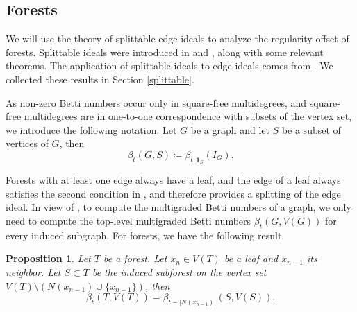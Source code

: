 \documentclass[dvipsnames,10pt]{article}
\newtheorem{proposition}[theorem]{Proposition}
\begin{document}
\subsection{Forests} \label{forests}

We will use the theory of splittable edge ideals to analyze the regularity offset of forests. Splittable ideals were introduced in \cite{ELIAHOU19901} and \cite{FATABBI200192}, along with some relevant theorems. The application of splittable ideals to edge ideals comes from \cite{split}. We collected these results in Section \ref{splittable}.

As non-zero Betti numbers occur only in square-free multidegrees, and square-free multidegrees are in one-to-one correspondence with subsets of the vertex set, we introduce the following notation. Let $G$ be a graph and let $S$ be a subset of vertices of $G$, then
\begin{equation*}
    \beta_t(G,S) \coloneq \beta_{t,\mathbf{1}_S}(I_G).
\end{equation*}

Forests with at least one edge always have a leaf, and the edge of a leaf always satisfies the second condition in , and therefore provides a splitting of the edge ideal. In view of , to compute the multigraded Betti numbers of a graph, we only need to compute the top-level multigraded Betti numbers $\beta_t(G,V(G))$ for every induced subgraph. For forests, we have the following result.

\begin{proposition} 
    Let $T$ be a forest. Let $x_n\in V(T)$ be a leaf and $x_{n-1}$ its neighbor. Let $S\subset T$ be the induced subforest on the vertex set $V(T)\setminus (N(x_{n-1})\cup \{x_{n-1}\})$, then
    \begin{equation*}
        \beta_t(T,V(T)) = \beta_{t-|N(x_{n-1})|}(S,V(S)).
    \end{equation*}
\end{proposition}
\end{document}
